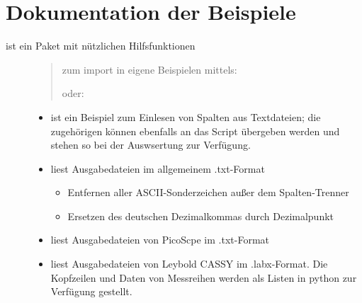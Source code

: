 \documentclass[letterpaper,10pt,english]{sphinxmanual}
\begin{document}
\chapter{Dokumentation der Beispiele}
\label{\detokenize{index:dokumentation-der-beispiele}}\begin{description}
\item[{ ist ein Paket mit nützlichen Hilfsfunktionen}] \leavevmode\begin{quote}

zum import in eigene Beispielen mittels:

\begin{sphinxVerbatim}[commandchars=\\\{\}]
   
\end{sphinxVerbatim}

oder:

\begin{sphinxVerbatim}[commandchars=\\\{\}]
   
\end{sphinxVerbatim}
\end{quote}
\begin{itemize}
\item {} 
 ist ein Beispiel zum
Einlesen von Spalten aus Textdateien; die zugehörigen
 können ebenfalls an das Script
übergeben werden und stehen so bei der Auswsertung zur Verfügung.

\item {} 
 liest Ausgabedateien im allgemeinem  .txt-Format
\begin{itemize}
\item {} 
Entfernen aller ASCII-Sonderzeichen außer dem Spalten-Trenner

\item {} 
Ersetzen des deutschen Dezimalkommas durch Dezimalpunkt

\end{itemize}

\item {} 
 liest Ausgabedateien von PicoScpe im .txt-Format

\item {} 
 liest Ausgabedateien von Leybold
CASSY im .labx-Format. Die Kopfzeilen und Daten von Messreihen
werden als Listen in python zur Verfügung gestellt.


\end{itemize}
\end{description}
\end{document}
